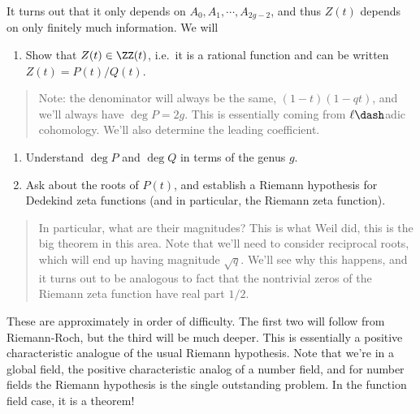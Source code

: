 \begin{answer}

It turns out that it only depends on \(A_0, A_1, \cdots, A_{2g-2}\), and
thus \(Z(t)\) depends on only finitely much information. We will

\begin{enumerate}
\def\labelenumi{\arabic{enumi}.}
\tightlist
\item
  Show that \(Z(t) \in \ZZ(t)\), i.e.~it is a rational function and can
  be written \(Z(t) = P(t)/ Q(t)\).
\end{enumerate}

\begin{quote}
Note: the denominator will always be the same, \((1-t)(1-qt)\), and
we'll always have \(\deg P = 2g\). This is essentially coming from
\(\ell\dash\)adic cohomology. We'll also determine the leading
coefficient.
\end{quote}

\begin{enumerate}
\def\labelenumi{\arabic{enumi}.}
\setcounter{enumi}{1}
\item
  Understand \(\deg P\) and \(\deg Q\) in terms of the genus \(g\).
\item
  Ask about the roots of \(P(t)\), and establish a Riemann hypothesis
  for Dedekind zeta functions (and in particular, the Riemann zeta
  function).
\end{enumerate}

\begin{quote}
In particular, what are their magnitudes? This is what Weil did, this is
the big theorem in this area. Note that we'll need to consider
reciprocal roots, which will end up having magnitude \(\sqrt{q}\). We'll
see why this happens, and it turns out to be analogous to fact that the
nontrivial zeros of the Riemann zeta function have real part \(1/2\).
\end{quote}

\end{answer}

These are approximately in order of difficulty. The first two will
follow from Riemann-Roch, but the third will be much deeper. This is
essentially a positive characteristic analogue of the usual Riemann
hypothesis. Note that we're in a global field, the positive
characteristic analog of a number field, and for number fields the
Riemann hypothesis is the single outstanding problem. In the function
field case, it is a theorem!

